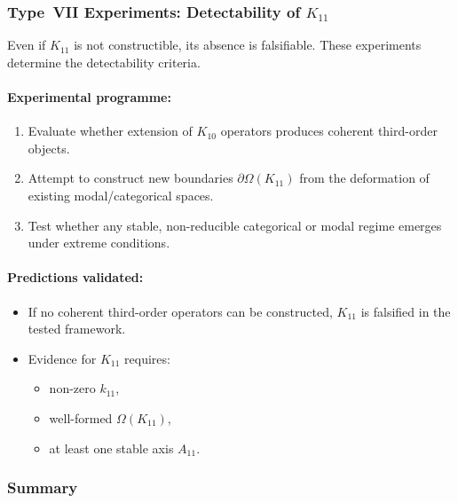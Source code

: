 \subsubsection{Type~VII Experiments: Detectability of $K_{11}$}

Even if $K_{11}$ is not constructible, its absence is falsifiable.  
These experiments determine the detectability criteria.

\paragraph{Experimental programme:}

\begin{enumerate}
    \item Evaluate whether extension of $K_{10}$ operators produces 
          coherent third-order objects.
    \item Attempt to construct new boundaries $\partial\Omega(K_{11})$ 
          from the deformation of existing modal/categorical spaces.
    \item Test whether any stable, non-reducible categorical or modal 
          regime emerges under extreme conditions.
\end{enumerate}

\paragraph{Predictions validated:}

\begin{itemize}
    \item If no coherent third-order operators can be constructed, 
          $K_{11}$ is falsified in the tested framework.
    \item Evidence for $K_{11}$ requires:
          \begin{itemize}
              \item non-zero $k_{11}$,
              \item well-formed $\Omega(K_{11})$,
              \item at least one stable axis $A_{11}$.
          \end{itemize}
\end{itemize}



\subsubsection{Summary}

